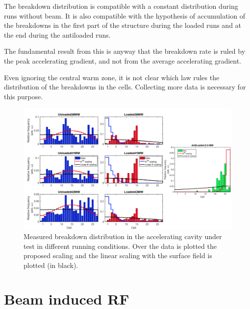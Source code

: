 The breakdown distribution is compatible with a constant distribution during runs without beam. It is also compatible with the hypothesis of accumulation of the breakdowns in  the first part of the structure during the loaded runs and at the end during the antiloaded runs.

The fundamental result from this is anyway that the breakdown rate is ruled by the peak accelerating gradient, and not from the average accelerating gradient.


Even ignoring the central warm zone, it is not clear which law rules the distribution of the breakdowns in the cells. Collecting more data is necessary for this purpose.



\begin{landscape}

\begin{figure}[h]
\centering 
\includegraphics[scale=0.53]{pictures/distro_all.png}
\caption{Measured breakdown distribution in the accelerating cavity under test in different running conditions. Over the data is plotted the proposed scaling and the linear scaling with the surface field is plotted (in black).}
\label{BD_distro}
\end{figure}
 
\end{landscape}







\section[Beam induced RF]{Beam induced RF}






